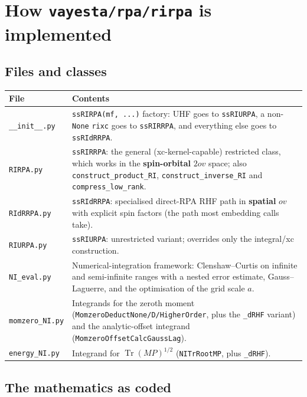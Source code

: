 \documentclass[11pt,a4paper]{article}
\newcommand{\code}[1]{\texttt{\small #1}}
\newcommand{\ov}{ov}
\newcommand{\Tr}{\operatorname{Tr}}
\begin{document}
\section{How \texttt{vayesta/rpa/rirpa} is implemented}

\subsection{Files and classes}

\begin{center}
\small
\begin{tabularx}{\textwidth}{@{}>{\raggedright\arraybackslash}p{3.2cm}L@{}}
\toprule
File & Contents \\
\midrule
\code{\_\_init\_\_.py} & \code{ssRIRPA(mf, ...)} factory: UHF goes to \code{ssRIURPA}, a non-\code{None}
  \code{rixc} goes to \code{ssRIRRPA}, and everything else goes to \code{ssRIdRRPA}. \\
\code{RIRPA.py} & \code{ssRIRRPA}: the general (xc-kernel-capable) restricted class, which works in the
  \textbf{spin-orbital} $2\ov$ space; also \code{construct\_product\_RI},
  \code{construct\_inverse\_RI} and \code{compress\_low\_rank}. \\
\code{RIdRRPA.py} & \code{ssRIdRRPA}: specialised direct-RPA RHF path in \textbf{spatial} $\ov$
  with explicit spin factors (the path most embedding calls take). \\
\code{RIURPA.py} & \code{ssRIURPA}: unrestricted variant; overrides only the integral/xc construction. \\
\code{NI\_eval.py} & Numerical-integration framework: Clenshaw--Curtis on infinite and
  semi-infinite ranges with a nested error estimate, Gauss--Laguerre, and the optimisation
  of the grid scale $a$. \\
\code{momzero\_NI.py} & Integrands for the zeroth moment (\code{MomzeroDeductNone/D/HigherOrder},
  plus the \code{\_dRHF} variant) and the analytic-offset integrand (\code{MomzeroOffsetCalcGaussLag}). \\
\code{energy\_NI.py} & Integrand for $\Tr (MP)^{1/2}$ (\code{NITrRootMP}, plus \code{\_dRHF}). \\
\bottomrule
\end{tabularx}
\end{center}

\subsection{The mathematics as coded}
\end{document}
